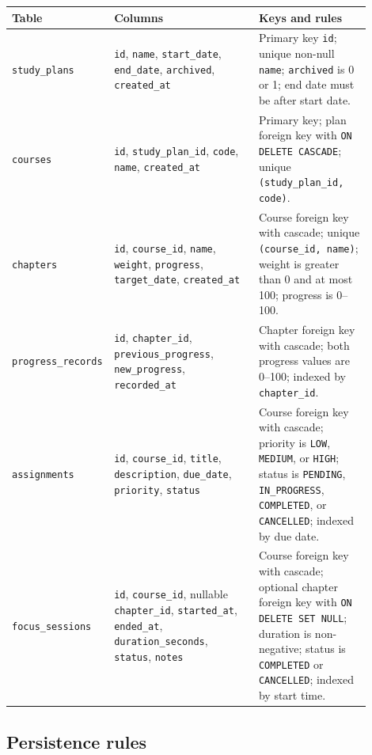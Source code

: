 \documentclass[11pt,a4paper]{article}
\newcommand{\code}[1]{\texttt{#1}}
\begin{document}
\small
\begin{longtable}{@{}L{0.19\linewidth}L{0.40\linewidth}L{0.31\linewidth}@{}}
\toprule
\textbf{Table} & \textbf{Columns} & \textbf{Keys and rules}\\
\midrule
\endhead
\code{study\_plans} & \code{id}, \code{name}, \code{start\_date}, \code{end\_date}, \code{archived}, \code{created\_at} & Primary key \code{id}; unique non-null \code{name}; \code{archived} is 0 or 1; end date must be after start date.\\
\code{courses} & \code{id}, \code{study\_plan\_id}, \code{code}, \code{name}, \code{created\_at} & Primary key; plan foreign key with \code{ON DELETE CASCADE}; unique \code{(study\_plan\_id, code)}.\\
\code{chapters} & \code{id}, \code{course\_id}, \code{name}, \code{weight}, \code{progress}, \code{target\_date}, \code{created\_at} & Course foreign key with cascade; unique \code{(course\_id, name)}; weight is greater than 0 and at most 100; progress is 0--100.\\
\code{progress\_records} & \code{id}, \code{chapter\_id}, \code{previous\_progress}, \code{new\_progress}, \code{recorded\_at} & Chapter foreign key with cascade; both progress values are 0--100; indexed by \code{chapter\_id}.\\
\code{assignments} & \code{id}, \code{course\_id}, \code{title}, \code{description}, \code{due\_date}, \code{priority}, \code{status} & Course foreign key with cascade; priority is \code{LOW}, \code{MEDIUM}, or \code{HIGH}; status is \code{PENDING}, \code{IN\_PROGRESS}, \code{COMPLETED}, or \code{CANCELLED}; indexed by due date.\\
\code{focus\_sessions} & \code{id}, \code{course\_id}, nullable \code{chapter\_id}, \code{started\_at}, \code{ended\_at}, \code{duration\_seconds}, \code{status}, \code{notes} & Course foreign key with cascade; optional chapter foreign key with \code{ON DELETE SET NULL}; duration is non-negative; status is \code{COMPLETED} or \code{CANCELLED}; indexed by start time.\\
\bottomrule
\end{longtable}
\normalsize

\subsection{Persistence rules}
\end{document}
